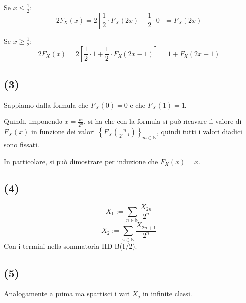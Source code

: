 \documentclass{article}
\begin{document}
Se $x \leq  \frac{1}{2}$:
\[
	2F_X(x) = 2\left[\frac{1}{2} \cdot  F_X(2x) + \frac{1}{2} \cdot  0\right] = F_X(2x)
\]

Se $x \geq  \frac{1}{2}$:
\[
	2F_X(x) = 2\left[\frac{1}{2} \cdot  1 + \frac{1}{2} \cdot  F_X(2x-1)\right] = 1+F_X(2x-1)
\]


\subsection{(3)}
Sappiamo dalla formula che $F_X\left(0\right)=0$ e che $F_X(1)=1$.

Quindi, imponendo $x=\frac{m}{2^n}$, si ha che con la formula si può ricavare il valore di $F_X(x)$ in funzione dei valori $\left\{F_X(\frac{m}{2^{n-1}})\right\}_{m\in \mathbb{N}}$, quindi tutti i valori diadici sono fissati.

In particolare, si può dimostrare per induzione che $F_X(x) = x$.

\subsection{(4)}
\[
	X_1 := \sum_{n\in \mathbb{N}} \frac{X_{2n}}{2^n}
\]
\[
	X_2 := \sum_{n\in \mathbb{N}}\frac{X_{2n+1}}{2^n}
\]
Con i termini nella sommatoria IID B(1/2).

\subsection{(5)}
Analogamente a prima ma spartisci i vari $X_j$ in infinite classi.
\end{document}
